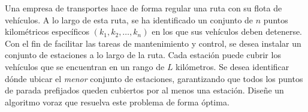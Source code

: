 \documentclass[12pt]{article}
\begin{document}
    \begin{ejercicio}[2 puntos]
        Una empresa de transportes hace de forma regular una ruta con su flota de vehículos. A lo largo de esta ruta, se ha identificado un conjunto de $n$ puntos kilométricos específicos $(k_1, k_2, \ldots, k_n)$ en los que sus vehículos deben detenerse. Con el fin de facilitar las tareas de mantenimiento y control, se desea instalar un conjunto de estaciones a lo largo de la ruta. Cada estación puede cubrir los vehículos que se encuentran en un rango de $L$ kilómetros. Se desea identificar dónde ubicar el \textit{menor} conjunto de estaciones, garantizando que todos los puntos de parada prefijados queden cubiertos por al menos una estación. Diseñe un algoritmo voraz que resuelva este problema de forma óptima.\\


\end{ejercicio}
\end{document}
